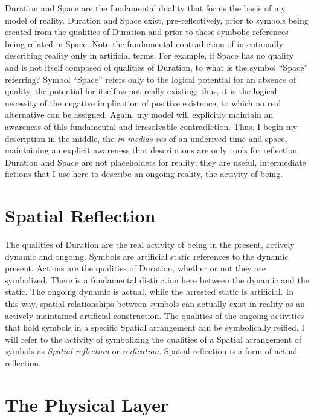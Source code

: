 Duration and Space are the fundamental duality that forms the basis of
my model of reality.  Duration and Space exist, pre-reflectively,
prior to symbols being created from the qualities of Duration and
prior to these symbolic references being related in Space.  Note the
fundamental contradiction of intentionally describing reality only in
artificial terms.  For example, if Space has no quality and is not
itself composed of qualities of Duration, to what is the symbol
``Space'' referring?  Symbol ``Space'' refers only to the logical
potential for an absence of quality, the potential for itself as not
really existing; thus, it is the logical necessity of the negative
implication of positive existence, to which no real alternative can be
assigned.  Again, my model will explicitly maintain an awareness of
this fundamental and irresolvable contradiction.  Thus, I begin my
description in the middle, the \emph{in medias res} of an underived
time and space, maintaining an explicit awareness that descriptions
are only tools for reflection.  Duration and Space are not
placeholders for reality; they are useful, intermediate fictions that
I use here to describe an ongoing reality, the activity of being.

\section{Spatial Reflection}

The qualities of Duration are the real activity of being in the
present, actively dynamic and ongoing.  Symbols are artificial static
references to the dynamic present.  Actions are the qualities of
Duration, whether or not they are symbolized.  There is a fundamental
distinction here between the dynamic and the static.  The ongoing
dynamic is actual, while the arrested static is artificial.  In this
way, spatial relationships between symbols can actually exist in
reality as an actively maintained artificial construction.  The
qualities of the ongoing activities that hold symbols in a specific
Spatial arrangement can be symbolically reified.  I will refer to the
activity of symbolizing the qualities of a Spatial arrangement of
symbols as \emph{Spatial reflection} or \emph{reification}.  Spatial
reflection is a form of actual reflection.

\section{The Physical Layer}


